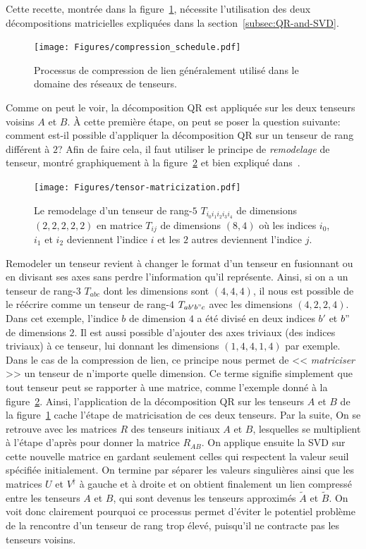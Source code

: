 Cette recette, montrée dans la figure~\ref{fig:compression-schedule}, nécessite l'utilisation des deux décompositions matricielles expliquées dans la section~\ref{subsec:QR-and-SVD}.
\begin{figure}[h]
    \centering
    \texttt{[image: Figures/compression\_schedule.pdf]}
    \caption{Processus de compression de lien généralement utilisé dans le domaine des réseaux de tenseurs.}
    \label{fig:compression-schedule}
\end{figure}
Comme on peut le voir, la décomposition QR est appliquée sur les deux tenseurs voisins $A$ et $B$.
À cette première étape, on peut se poser la question suivante: comment est-il possible d'appliquer la décomposition QR sur un tenseur de rang différent à $2$?
Afin de faire cela, il faut utiliser le principe de \emph{remodelage} de tenseur, montré graphiquement à la figure~\ref{fig:tensor-reshape} et bien expliqué dans~\cite{baker2021methodes}.
\begin{figure}[h]
    \centering
    \texttt{[image: Figures/tensor-matricization.pdf]}
    \caption{Le remodelage d'un tenseur de rang-$5$ $T_{i_0i_1i_2i_3i_4}$ de dimensions $(2, 2, 2, 2, 2)$ en matrice $T_{ij}$ de dimensions $(8, 4)$ où les indices $i_0$, $i_1$ et $i_2$ deviennent l'indice $i$ et les $2$ autres deviennent l'indice $j$.}
    \label{fig:tensor-reshape}
\end{figure}
Remodeler un tenseur revient à changer le format d'un tenseur en fusionnant ou en divisant ses axes sans perdre l'information qu'il représente.
Ainsi, si on a un tenseur de rang-$3$ $T_{abc}$ dont les dimensions sont $(4,4,4)$, il nous est possible de le réécrire comme un tenseur de rang-$4$ $T_{ab'b"c}$  avec les dimensions $(4,2,2,4)$.
Dans cet exemple, l'indice $b$ de dimension $4$ a été divisé en deux indices $b'$ et $b"$ de dimensions $2$.
Il est aussi possible d'ajouter des axes triviaux (des indices triviaux) à ce tenseur, lui donnant les dimensions $(1,4,4,1,4)$ par exemple.
Dans le cas de la compression de lien, ce principe nous permet de << \textit{matriciser} >> un tenseur de n'importe quelle dimension.
Ce terme signifie simplement que tout tenseur peut se rapporter à une matrice, comme l'exemple donné à la figure~\ref{fig:tensor-reshape}.
Ainsi, l'application de la décomposition QR sur les tenseurs $A$ et $B$ de la figure~\ref{fig:compression-schedule} cache l'étape de matricisation de ces deux tenseurs.
Par la suite, On se retrouve avec les matrices $R$ des tenseurs initiaux $A$ et $B$, lesquelles se multiplient à l'étape d'après pour donner la matrice $R_{AB}$.
On applique ensuite la SVD sur cette nouvelle matrice en gardant seulement celles qui respectent la valeur seuil spécifiée initialement.
On termine par séparer les valeurs singulières ainsi que les matrices $U$ et $V^\dagger$ à gauche et à droite et on obtient finalement un lien compressé entre les tenseurs $A$ et $B$, qui sont devenus les tenseurs approximés $\tilde{A}$ et $\tilde{B}$.
On voit donc clairement pourquoi ce processus permet d'éviter le potentiel problème de la rencontre d'un tenseur de rang trop élevé, puisqu'il ne contracte pas les tenseurs voisins.
